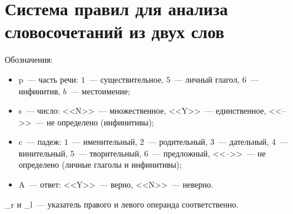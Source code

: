 \documentclass[main]{subfiles}
\begin{document}
\section{Система правил для анализа словосочетаний из двух слов}\label{app:B}

Обозначения:\begin{itemize}
	\item p~--- часть речи: $1$~--- существительное, $5$~--- личный глагол, $6$~--- инфинитив, $b$~--- местоимение;
	\item s~--- число: <<N>>~--- множественное, <<Y>>~--- единственное, <<-->>~--- не определено (инфинитивы);
	\item c~--- падеж: $1$~--- именительный, $2$~--- родительный, $3$~--- дательный, $4$~--- винительный, $5$~--- творительный, $6$~--- предложный, <<-->>~--- не определено (личные глаголы и инфинитивы);
	\item A~--- ответ: <<Y>>~--- верно, <<N>>~--- неверно.
\end{itemize}
\_r и \_l~--- указатель правого и левого операнда соответственно.
\end{document}
